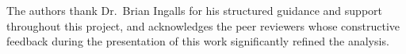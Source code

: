 \documentclass[sigplan,screen]{acmart}
\begin{document}

\maketitle








\begin{acks}
The authors thank Dr.\ Brian Ingalls for his structured guidance and support throughout this
project, and acknowledges the peer reviewers whose constructive feedback during
the presentation of this work significantly refined the analysis.
\end{acks}



\end{document}
